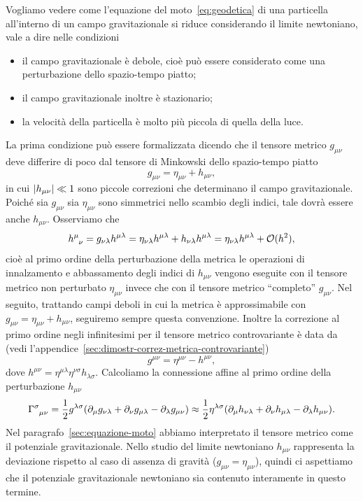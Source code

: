 Vogliamo vedere come l'equazione del moto~\eqref{eq:geodetica} di una particella
all'interno di un campo gravitazionale si riduce considerando il limite
newtoniano, vale a dire nelle condizioni
\begin{itemize}
\item il campo gravitazionale è debole, cioè può essere considerato come una
  perturbazione dello spazio-tempo piatto;
\item il campo gravitazionale inoltre è stazionario;
\item la velocità della particella è molto più piccola di quella della luce.
\end{itemize}
La prima condizione può essere formalizzata dicendo che il
tensore metrico $g_{\mu\nu}$ deve differire di poco dal
tensore di Minkowski dello spazio-tempo piatto
\begin{equation}
  g_{\mu\nu} = \eta_{\mu\nu} + h_{\mu\nu},
\end{equation}
in cui $\lvert h_{\mu\nu}\rvert \ll 1$ sono piccole correzioni che determinano il campo
gravitazionale.  Poiché sia $g_{\mu\nu}$ sia $\eta_{\mu\nu}$ sono simmetrici
nello scambio degli indici, tale dovrà essere anche $h_{\mu\nu}$.  Osserviamo
che
\begin{equation}
  \tensor{h}{^{\mu}_{\nu}} = g_{\nu\lambda}h^{\mu\lambda} =
  \eta_{\nu\lambda}h^{\mu\lambda} + h_{\nu\lambda}h^{\mu\lambda} =
  \eta_{\nu\lambda}h^{\mu\lambda} + \mathcal{O}(h^{2}),
\end{equation}
cioè al primo ordine della perturbazione della metrica le operazioni di
innalzamento e abbassamento degli indici di $h_{\mu\nu}$ vengono eseguite con il
tensore metrico non perturbato $\eta_{\mu\nu}$ invece che con il tensore metrico
``completo'' $g_{\mu\nu}$.  Nel seguito, trattando campi deboli in cui la
metrica è approssimabile con $g_{\mu\nu} = \eta_{\mu\nu} + h_{\mu\nu}$,
seguiremo sempre questa convenzione.  Inoltre la correzione al primo ordine
negli infinitesimi per il tensore metrico controvariante è data da (vedi
l'appendice~\ref{sec:dimostr-correz-metrica-controvariante})
\begin{equation}
  \label{eq:correzione-metrica-controvariante}
  g^{\mu\nu} = \eta^{\mu\nu} - h^{\mu\nu},
\end{equation}
dove $h^{\mu\nu} = \eta^{\mu\lambda}\eta^{\nu\sigma} h_{\lambda\sigma}$.
Calcoliamo la connessione affine al primo ordine della perturbazione
$h_{\mu\nu}$
\begin{equation}
  \label{eq:christoffel-approx}
  \tensor{\Gamma}{^{\sigma}_{\mu\nu}} = \frac{1}{2}g^{\lambda\sigma}
  (\partial_{\mu}g_{\nu\lambda} + \partial_{\nu}g_{\mu\lambda}
  - \partial_{\lambda}g_{\mu\nu}) \approx \frac{1}{2}\eta^{\lambda\sigma}
  (\partial_{\mu}h_{\nu\lambda} + \partial_{\nu}h_{\mu\lambda}
  - \partial_{\lambda}h_{\mu\nu}).
\end{equation}
Nel paragrafo~\ref{sec:equazione-moto} abbiamo interpretato il tensore metrico
come il potenziale gravitazionale.  Nello studio del limite newtoniano
$h_{\mu\nu}$ rappresenta la deviazione rispetto al caso di assenza di gravità
($g_{\mu\nu} = \eta_{\mu\nu}$), quindi ci aspettiamo che il potenziale
gravitazionale newtoniano sia contenuto interamente in questo termine.


